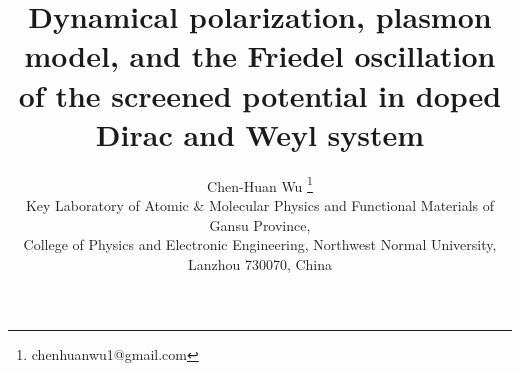 \documentclass[UTF8,a4paper]{article}
\begin{document}

\title{\bf Dynamical polarization, plasmon model, and the Friedel oscillation of the screened potential in doped
Dirac and Weyl system}
\author{Chen-Huan Wu
\thanks{chenhuanwu1@gmail.com}
\\Key Laboratory of Atomic $\&$ Molecular Physics and Functional Materials of Gansu Province,
\\College of Physics and Electronic Engineering, Northwest Normal University, Lanzhou 730070, China}
\end{document}
